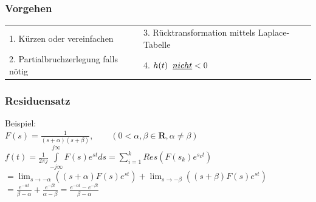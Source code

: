 		\subsubsection{Vorgehen}
			\begin{tabular}{p{6cm}p{6cm}}
				1. Kürzen oder vereinfachen &
				3. Rücktransformation mittels Laplace-Tabelle \\
				2. Partialbruchzerlegung falls nötig &
				4. $h(t)\hspace{0.2cm}\underline{nicht} < 0$ \\
			\end{tabular}
			
		\subsubsection{Residuensatz}
			Beispiel:\\
			$F(s) = \frac{1}{(s+\alpha)(s+\beta)}, \qquad (0 < \alpha,\beta \in \mathbf{R}, \alpha \neq \beta)$\\
			$f(t) = \frac{1}{2\pi j} \int\limits_{-j\infty}^{j\infty} F(s)e^{st} ds = \sum\limits_{i=1}^k Res(F(s_k)e^{s_kt})$\\
			$=\lim_{s \to -\alpha} ((s+\alpha)F(s)e^{st}) + \lim_{s \to -\beta}((s+\beta)F(s)e^{st})$\\
			$=\frac{e^{-\alpha t}}{\beta - \alpha} + \frac{e^{-\beta t}}{\alpha - \beta} = \frac{e^{-\alpha t}-e^{-\beta t}}{\beta - \alpha}$
			
			
